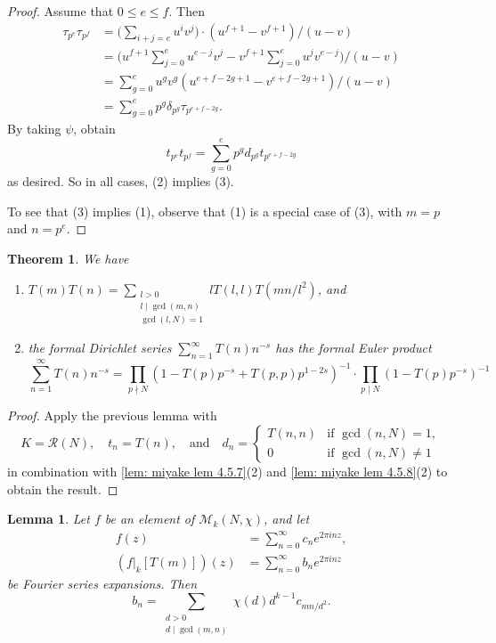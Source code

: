 \documentclass[10pt,leqno,twoside]{article}
\theoremstyle{plain}
\newtheorem{lemma}[lem]{Lemma}
\newtheorem{theorem}[lem]{Theorem}
\theoremstyle{definition}
\numberwithin{equation}{section}
\numberwithin{lem}{section}
\begin{document}
\begin{proof}
    Assume that $0\leq e\leq f$. Then \begin{align*}
        \tau_{p^e}\tau_{p^f} &= \bigg(\sum_{i+j=e}u^iv^j\bigg)\cdot (u^{f+1}-v^{f+1})/(u-v)\\
        &= \bigg(u^{f+1}\sum_{j=0}^eu^{e-j}v^j - v^{f+1}\sum_{j=0}^eu^{j}v^{e-j}\bigg)\bigg/(u-v)\\
        &=\sum_{g=0}^e u^gv^g(u^{e+f-2g+1}-v^{e+f-2g+1})/(u-v)\\
        &=\sum_{g=0}^e p^g\delta_{p^g}\tau_{p^{e+f-2g}}.
    \end{align*}
    By taking $\psi$, obtain \[t_{p^e}t_{p^f} = \sum_{g=0}^ep^gd_{p^g}t_{p^{e+f-2g}}\] as desired. So in all cases, (2) implies (3).

    To see that (3) implies (1), observe that (1) is a special case of (3), with $m = p$ and $n = p^e$.
\end{proof}
\begin{theorem}\label{thm: miyake thm 4.5.13}
    We have \begin{enumerate}[label=\textup{(\arabic*)}]
        \item $T(m)T(n) = \sum_{\substack{l>0 \\ l\mid \gcd(m,n)\\ \gcd(l,N)=1}}lT(l,l)T(mn/l^2)$, and
        \item the formal Dirichlet series $\sum_{n=1}^\infty T(n)n^{-s}$ has the formal Euler product \[\sum_{n=1}^\infty T(n)n^{-s} = \prod_{p\nmid N}(1-T(p)p^{-s} + T(p,p)p^{1-2s})^{-1}\cdot \prod_{p\mid N}(1-T(p)p^{-s})^{-1}\]
    \end{enumerate}
\end{theorem}
\begin{proof}
    Apply the previous lemma with 
    \[K = \mathcal R(N),\quad t_n = T(n),\quad \text{and}\quad d_n =\begin{cases}
        T(n,n) & \text{if $\gcd(n,N) = 1$},\\
        0 & \text{if $\gcd(n,N)\neq 1$}
    \end{cases}\] in combination with \cref{lem: miyake lem 4.5.7}(2) and \cref{lem: miyake lem 4.5.8}(2) to obtain the result.
\end{proof}
\begin{lemma}\label{lem: miyake lem 4.5.14}
    Let $f$ be an element of $\mathcal M_k(N,\chi)$, and let \begin{align*}
        f(z) &= \sum_{n=0}^\infty c_ne^{2\pi i n z},\\
        (f|_k[T(m)])(z) &= \sum_{n=0}^\infty b_ne^{2\pi i nz}
    \end{align*} be Fourier series expansions. Then \[b_n = \sum_{\substack{d>0 \\ d\mid \gcd(m,n)}}\chi(d)d^{k-1}c_{mn/d^2}.\]
\end{lemma}
\end{document}
